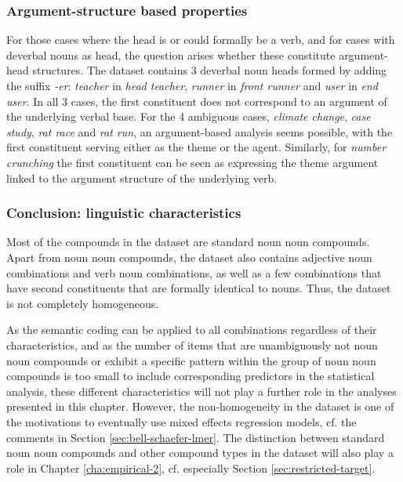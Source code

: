 


\subsubsection{Argument-structure based properties}
\label{sec:arg-struc}

For those cases where the head is or could formally be a verb, and for cases
with deverbal nouns as head, the question arises whether these constitute
argument-head structures. The dataset contains 3 deverbal noun heads
formed by adding the suffix \emph{-er}: \emph{teacher} in
\emph{head teacher}, \emph{runner} in \emph{front runner} and
\emph{user} in \emph{end user}. In all 3 cases,
the first constituent does not correspond to an argument of the underlying
verbal base. For the 4 ambiguous cases, \emph{climate change}, \emph{case
  study}, \emph{rat race} and \emph{rat run}, an argument-based analysis seems possible, with
the first constituent serving either as the theme or the agent. Similarly, for
\emph{number crunching} the first constituent can be seen as expressing the
theme argument linked to the argument structure of the underlying verb.


\subsubsection{Conclusion: linguistic characteristics}
\label{sec:conclusion-linguistic-properties}

Most of the compounds in the dataset are standard noun noun
compounds. Apart from noun noun compounds, the dataset also contains adjective noun
combinations and verb noun combinations, as well as a few combinations
that have second constituents that are formally identical to
nouns. Thus, the dataset is not completely homogeneous. 

As the semantic coding can be applied to all combinations
regardless of their characteristics, and as the number of items that
are unambiguously not noun noun compounds or exhibit a specific
pattern within the group of noun noun compounds is too small to include
corresponding predictors in the statistical analysis, these different characteristics will
not play a further role in the analyses presented in this
chapter. However, the non-homogeneity in the dataset is one of the
motivations to eventually use mixed effects regression models, cf. the
comments in Section \ref{sec:bell-schaefer-lmer}.
\enlargethispage{1\baselineskip}
The distinction between standard noun noun compounds and other compound
types in the dataset will also play a role in Chapter
\ref{cha:empirical-2}, cf. especially Section
\ref{sec:restricted-target}. 


